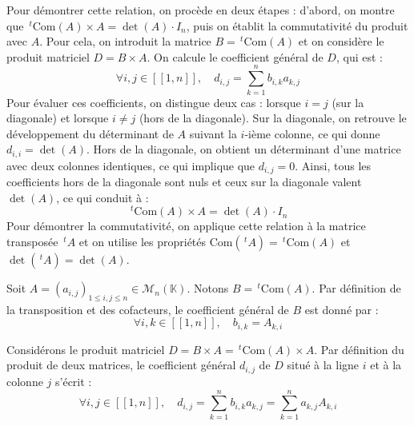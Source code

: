 \documentclass[11pt, a4paper]{article}
\theoremstyle{definition}
\begin{document}
\begin{tcolorbox}[methodstyle]
	Pour démontrer cette relation, on procède en deux étapes : d'abord, on montre que $\,^t\mathrm{Com}(A) \times A = \det(A) \cdot I_n$, puis on établit la commutativité du produit avec $A$. Pour cela, on introduit la matrice $B = \,^t\mathrm{Com}(A)$ et on considère le produit matriciel $D = B \times A$. On calcule le coefficient général de $D$, qui est :
	$$\forall i,j \in [\![1,n]\!], \quad d_{i,j} = \sum_{k=1}^n b_{i,k} a_{k,j}$$
	Pour évaluer ces coefficients, on distingue deux cas : lorsque $i = j$ (sur la diagonale) et lorsque $i \neq j$ (hors de la diagonale). Sur la diagonale, on retrouve le développement du déterminant de $A$ suivant la $i$-ième colonne, ce qui donne $d_{i,i} = \det(A)$. Hors de la diagonale, on obtient un déterminant d'une matrice avec deux colonnes identiques, ce qui implique que $d_{i,j} = 0$. Ainsi, tous les coefficients hors de la diagonale sont nuls et ceux sur la diagonale valent $\det(A)$, ce qui conduit à :
	$$\,^t\mathrm{Com}(A) \times A = \det(A) \cdot I_n$$
	Pour démontrer la commutativité, on applique cette relation à la matrice transposée $\,^tA$ et on utilise les propriétés $\mathrm{Com}(\,^tA) = \,^t\mathrm{Com}(A)$ et $\det(\,^tA) = \det(A)$.
\end{tcolorbox}

Soit $A = (a_{i,j})_{1 \le i,j \le n} \in \mathcal{M}_n(\mathbb{K})$. Notons $B = \,^t\mathrm{Com}(A)$. Par définition de la transposition et des cofacteurs, le coefficient général de $B$ est donné par :
$$\forall i,k \in [\![1,n]\!], \quad b_{i,k} = A_{k,i}$$

Considérons le produit matriciel $D = B \times A = \,^t\mathrm{Com}(A) \times A$. Par définition du produit de deux matrices, le coefficient général $d_{i,j}$ de $D$ situé à la ligne $i$ et à la colonne $j$ s'écrit :
$$\forall i,j \in [\![1,n]\!], \quad d_{i,j} = \sum_{k=1}^n b_{i,k} a_{k,j} = \sum_{k=1}^n a_{k,j} A_{k,i}$$
\end{document}
